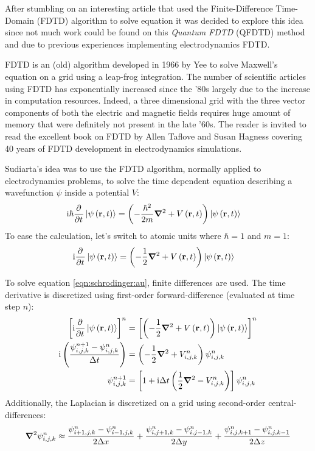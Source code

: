 After stumbling on an interesting article that used the Finite-Difference
Time-Domain (FDTD) algorithm to solve \schrodinger equation\cite{Sudiarta2007}
it was decided to explore this idea since not much work could be found on this
\textit{Quantum FDTD} (QFDTD) method and due to previous experiences
implementing electrodynamics FDTD.

FDTD is an (old) algorithm developed in 1966 by Yee\cite{Yee1966} to solve
Maxwell's equation on a grid using a leap-frog integration. The number of
scientific articles using FDTD has exponentially increased since the '80s
largely due to the increase in computation resources. Indeed, a three
dimensional grid with the three vector components of both the electric and
magnetic fields requires huge amount of memory that were definitely not present
in the late '60s. The reader is invited to read the excellent book on FDTD by
Allen Taflove and Susan Hagness\cite{Taflove2005} covering 40 years of FDTD
development in electrodynamics simulations.

Sudiarta's idea was to use the FDTD algorithm, normally applied to
electrodynamics problems, to solve the time dependent \schrodinger equation
describing a wavefunction $\psi$ inside a potential $V$:
\begin{align}
\textrm{i} \hbar \frac{\partial^{{}}   }{\partial t^{{}}} \left| \psi\left( \textbf{r}, t \right) \right>
    & = \left( -\frac{\hbar^2}{2 m} \bm{\nabla}^2 + V\left( \textbf{r}, t \right)  \right) \left| \psi\left( \textbf{r},
t \right) \right>
\label{eqn:schrodinger:si}
\end{align}
To ease the calculation, let's switch to atomic units where $\hbar = 1$ and $m
= 1$:
\begin{align}
\textrm{i} \frac{\partial^{{}}   }{\partial t^{{}}} \left| \psi\left( \textbf{r}, t \right) \right>
    & = \left( -\frac{1}{2} \bm{\nabla}^2 + V\left( \textbf{r}, t \right)  \right) \left| \psi\left( \textbf{r}, t \right) \right>
\label{eqn:schrodinger:au}
\end{align}

To solve equation \eqref{eqn:schrodinger:au}, finite differences are
used. The time derivative is discretized using first-order forward-difference
(evaluated at time step $n$):
\begin{align}
\left[  \textrm{i} \frac{\partial^{{}} }{\partial {t}^{{}}} \left| \psi\left( \textbf{r}, t \right) \right>  \right]^{n}
    & = \left[ 
            \left( -\frac{1}{2} \bm{\nabla}^2 + V\left( \textbf{r}, t \right)  \right)
            \left| \psi\left( \textbf{r},t \right) \right>
         \right]^{n} \\
\textrm{i} \left( \frac{\psi_{i,j,k}^{n+1} - \psi_{i,j,k}^{n}}{\Delta t} \right)
& = \left( -\frac{1}{2} \bm{\nabla}^2 + V_{i,j,k}^{n}  \right) \psi_{i,j,k}^{n} \\
\psi_{i,j,k}^{n+1} & =
    \left[ 
        1 + \textrm{i} \Delta t \left(  \frac{1}{2} \bm{\nabla}^2 - V_{i,j,k}^{n}  \right)
     \right] \psi_{i,j,k}^{n}
\label{eqn:schrodinger:discretized}
\end{align}
Additionally, the Laplacian is discretized on a grid using second-order
central-differences:
\begin{align}
\bm{\nabla}^2 \psi_{i,j,k}^{n} \approx
      \frac{ \psi_{i+1,j,k}^{n} - \psi_{i-1,j,k}^{n} }{2 \Delta x}
    + \frac{ \psi_{i,j+1,k}^{n} - \psi_{i,j-1,k}^{n} }{2 \Delta y}
    + \frac{ \psi_{i,j,k+1}^{n} - \psi_{i,j,k-1}^{n} }{2 \Delta z}
\label{eqn:laplacian:discretized}
\end{align}

